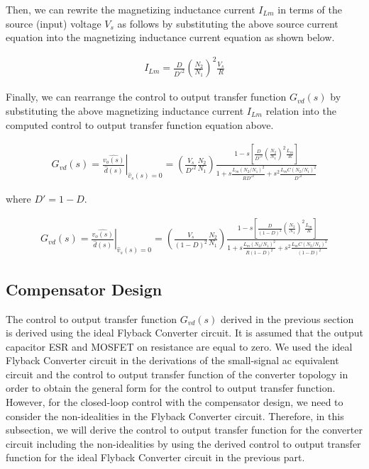 Then, we can rewrite the magnetizing inductance current $I_{Lm}$ in terms of the source (input) voltage $V_s$ as follows by substituting the above source current equation into the magnetizing inductance current equation as shown below.

\begin{align}
    I_{Lm} =  \frac{D}{D'^2}\left(\frac{N_2}{N_1} \right)^2\frac{V_s}{R}
\end{align}

Finally, we can rearrange the control to output transfer function $G_{vd}(s)$ by substituting the above magnetizing inductance current $I_{Lm}$ relation into the computed control to output transfer function equation above.

\begin{align}
   \left. G_{vd}(s) = \frac{\hat{v_o(s)}}{\hat{d}(s)}\right \vert_{\hat{v}_s(s) = 0} = \left(\frac{V_s}{D'^2}\frac{N_2}{N_1} \right)\frac{1 - s\left[ \frac{D}{D'^2}\left(\frac{N_2}{N_1} \right)^2\frac{L_m}{R}\right]}{1 + s\frac{L_m(N_2/N_1)^2}{RD'^2} + s^2\frac{L_mC(N_2/N_1)^2}{D'^2}}
\end{align}

where $D' = 1-D$.

\begin{align}
   \left. G_{vd}(s) = \frac{\hat{v_o(s)}}{\hat{d}(s)}\right \vert_{\hat{v}_s(s) = 0} = \left(\frac{V_s}{(1-D)^2}\frac{N_2}{N_1} \right)\frac{1 - s\left[ \frac{D}{(1-D)^2}\left(\frac{N_2}{N_1} \right)^2\frac{L_m}{R}\right]}{1 + s\frac{L_m(N_2/N_1)^2}{R(1-D)^2} + s^2\frac{L_mC(N_2/N_1)^2}{(1-D)^2}}
\end{align}

\subsection{Compensator Design}

The control to output transfer function $G_{vd}(s)$ derived in the previous section is derived using the ideal Flyback Converter circuit. It is assumed that the output capacitor ESR and MOSFET on resistance are equal to zero. We used the ideal Flyback Converter circuit in the derivations of the small-signal ac equivalent circuit and the control to output transfer function of the converter topology in order to obtain the general form for the control to output transfer function. However, for the closed-loop control with the compensator design, we need to consider the non-idealities in the Flyback Converter circuit. Therefore, in this subsection, we will derive the control to output transfer function for the converter circuit including the non-idealities by using the derived control to output transfer function for the ideal Flyback Converter circuit in the previous part.

